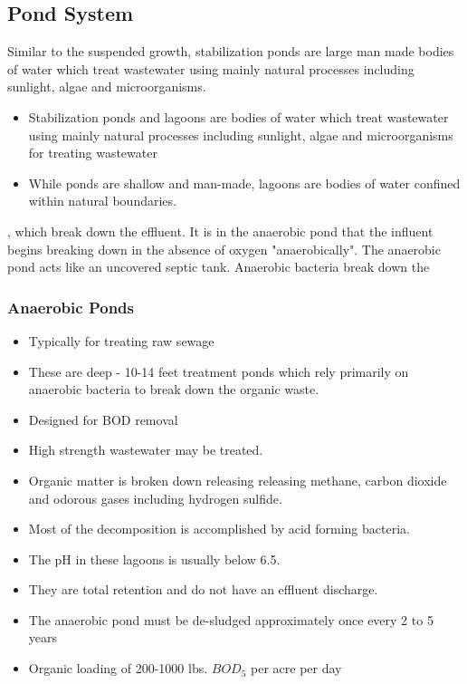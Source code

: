 \subsection{Pond System}
Similar to the suspended growth, stabilization ponds are large man made bodies of water which treat wastewater using mainly natural processes including sunlight, algae and microorganisms.
\begin{itemize}
\item Stabilization ponds and lagoons are bodies of water which treat wastewater using mainly natural processes including sunlight, algae and microorganisms for treating wastewater\\
\item While ponds are shallow and man-made, lagoons are bodies of water confined within natural boundaries.\\
\end{itemize}

 , which break down the effluent. It is in the anaerobic pond that the influent begins breaking down in the absence of oxygen "anaerobically". The anaerobic pond acts like an uncovered septic tank. Anaerobic bacteria break down the 

\subsubsection{Anaerobic Ponds}	

\begin{itemize}	
\item Typically for treating raw sewage
\item These are deep - 10-14 feet treatment ponds which rely primarily on anaerobic bacteria to break down the organic waste.
\item Designed for BOD removal
\item High strength wastewater may be treated.
\item Organic matter is broken down releasing releasing methane, carbon dioxide and odorous gases including hydrogen sulfide. 
\item Most of the decomposition is accomplished by acid forming bacteria. 
\item The pH in these lagoons is usually below 6.5. 
\item They are total retention and do not have an effluent discharge. 
\item The anaerobic pond must be de-sludged approximately once every 2 to 5 years
\item Organic loading of 200-1000 lbs. $BOD_5$ per acre per day
\end{itemize}

